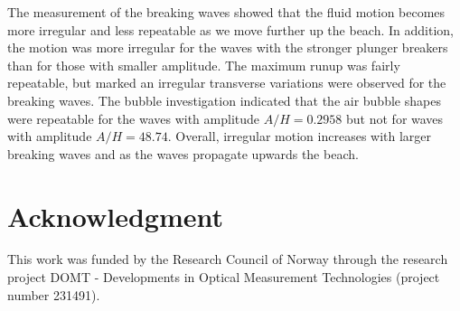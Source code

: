 \documentclass[a4paper, 11pt, english, twoside, openright]{article}
\begin{document}
The measurement of the breaking waves showed that the fluid motion becomes more irregular and less repeatable as we move further up the beach. In addition, the motion was more irregular for the waves with the stronger plunger breakers than for those with smaller amplitude. The maximum runup was fairly repeatable, but marked an irregular
transverse  variations were observed for the breaking waves. The bubble investigation indicated
 that the air bubble shapes  were repeatable  for the waves with amplitude $A/H=0.2958$ but not for waves with amplitude  $A/H=48.74$. Overall, irregular motion increases with larger breaking waves and as the waves propagate upwards the beach.  

\section*{Acknowledgment}

This work was funded by the Research Council of Norway through the research project DOMT - Developments in Optical Measurement Technologies (project number 231491).
 

\end{document}
